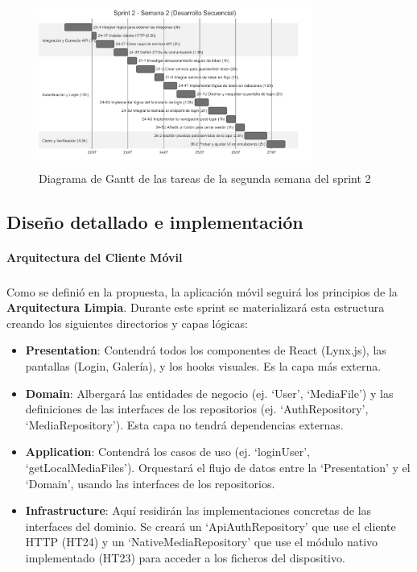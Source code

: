 \begin{figure}[H]
    \begin{center}
        \includegraphics[width=0.8\textwidth]{assets/sprint2/week2-gantt.png}
    \end{center}
    \caption{Diagrama de Gantt de las tareas de la segunda semana del sprint 2}\label{fig:gantt-sprint2-week2}
\end{figure}


\subsection{Diseño detallado e implementación}

\paragraph{Arquitectura del Cliente Móvil}
\subparagraph{}
Como se definió en la propuesta, la aplicación móvil seguirá los principios de la \textbf{Arquitectura Limpia}. Durante este sprint se materializará esta estructura creando los siguientes directorios y capas lógicas:
\begin{itemize}
    \item \textbf{Presentation}: Contendrá todos los componentes de React (Lynx.js), las pantallas (Login, Galería), y los hooks visuales. Es la capa más externa.
    \item \textbf{Domain}: Albergará las entidades de negocio (ej. `User', `MediaFile') y las definiciones de las interfaces de los repositorios (ej. `AuthRepository', `MediaRepository'). Esta capa no tendrá dependencias externas.
    \item \textbf{Application}: Contendrá los casos de uso (ej. `loginUser', `getLocalMediaFiles'). Orquestará el flujo de datos entre la `Presentation' y el `Domain', usando las interfaces de los repositorios.
    \item \textbf{Infrastructure}: Aquí residirán las implementaciones concretas de las interfaces del dominio. Se creará un `ApiAuthRepository' que use el cliente HTTP (HT24) y un `NativeMediaRepository' que use el módulo nativo implementado (HT23) para acceder a los ficheros del dispositivo.
\end{itemize}

